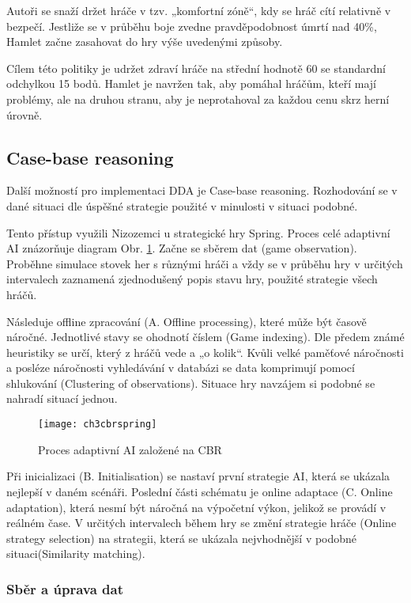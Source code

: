 Autoři se snaží držet hráče v tzv. „komfortní zóně“, kdy se hráč cítí relativně v bezpečí. Jestliže se v průběhu boje zvedne pravděpodobnost úmrtí nad 40\%, Hamlet začne zasahovat do hry výše uvedenými způsoby.

Cílem této politiky je udržet zdraví hráče na střední hodnotě 60 se standardní odchylkou 15 bodů. Hamlet je navržen tak, aby pomáhal hráčům, kteří mají problémy, ale na druhou stranu, aby je neprotahoval za každou cenu skrz herní úrovně.

\subsection{Case-base reasoning}

Další možností pro implementaci DDA je Case-base reasoning. Rozhodování se v dané situaci dle úspěšné strategie použité v minulosti v situaci podobné.

Tento přístup využili Nizozemci u strategické hry Spring. \cite{21cbr} Proces celé adaptivní AI znázorňuje diagram Obr. \ref{fig:ch3cbrspring}.
Začne se sběrem dat (game observation). Proběhne simulace stovek her s různými hráči a vždy se v průběhu hry v určitých intervalech zaznamená zjednodušený popis stavu hry, použité strategie všech hráčů. 

Následuje offline zpracování (A. Offline processing), které může být časově náročné. Jednotlivé stavy se ohodnotí číslem (Game indexing). Dle předem známé heuristiky se určí, který z hráčů vede a „o kolik“. Kvůli velké paměťové náročnosti a posléze náročnosti vyhledávání v databázi se data komprimují pomocí shlukování (Clustering of observations). Situace hry navzájem si podobné se nahradí situací jednou.
 
\begin{figure}
  \centering
  \texttt{[image: ch3cbrspring]}
	\caption{Proces adaptivní AI založené na CBR \cite{21cbr}}
	\label{fig:ch3cbrspring}
\end{figure}

Při inicializaci (B. Initialisation) se nastaví první strategie AI, která se ukázala nejlepší v daném scénáři. Poslední části schématu je online adaptace (C. Online adaptation), která nesmí být náročná na výpočetní výkon, jelikož se provádí v reálném čase. V určitých intervalech během hry se změní strategie hráče (Online strategy selection) na strategii, která se ukázala nejvhodnější v podobné situaci(Similarity matching).

\subsubsection{Sběr a úprava dat}

